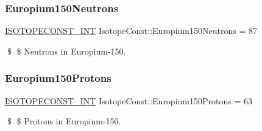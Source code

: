 \subsubsection{\texorpdfstring{Europium150\+Neutrons}{Europium150Neutrons}}
{\footnotesize\ttfamily \mbox{\hyperlink{group___isotope_const-_macros_ga5f18360b3e99483a35c32d789e62621c}{I\+S\+O\+T\+O\+P\+E\+C\+O\+N\+S\+T\+\_\+\+I\+NT}} Isotope\+Const\+::\+Europium150\+Neutrons = 87}

\$ \$ Neutrons in Europium-\/150. \mbox{\label{group___isotope_const-_europium-_eu150_ga11a53b4c67d3080c839d75ad4e783f1b}} 
\subsubsection{\texorpdfstring{Europium150\+Protons}{Europium150Protons}}
{\footnotesize\ttfamily \mbox{\hyperlink{group___isotope_const-_macros_ga5f18360b3e99483a35c32d789e62621c}{I\+S\+O\+T\+O\+P\+E\+C\+O\+N\+S\+T\+\_\+\+I\+NT}} Isotope\+Const\+::\+Europium150\+Protons = 63}

\$ \$ Protons in Europium-\/150. 